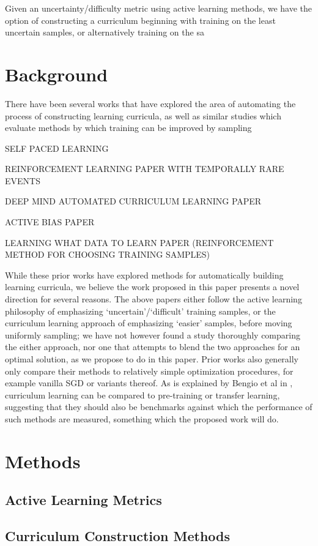 \documentclass[a4paper,11pt]{article}
\begin{document}
Given an uncertainty/difficulty metric using active learning methods, we have the option of constructing a curriculum beginning with training on the least uncertain samples, or alternatively training on the sa 

\section{Background}
There have been several works that have explored the area of automating the process of constructing learning curricula, as well as similar studies which evaluate methods by which training can be improved by sampling 

SELF PACED LEARNING

REINFORCEMENT LEARNING PAPER WITH TEMPORALLY RARE EVENTS

DEEP MIND AUTOMATED CURRICULUM LEARNING PAPER

ACTIVE BIAS PAPER

LEARNING WHAT DATA TO LEARN PAPER (REINFORCEMENT METHOD FOR CHOOSING TRAINING SAMPLES)

While these prior works have explored methods for automatically building learning curricula, we believe the work proposed in this paper presents a novel direction for several reasons. The above papers either follow the active learning philosophy of emphasizing `uncertain'/`difficult' training samples, or the curriculum learning approach of emphasizing `easier' samples, before moving uniformly sampling; we have not however found a study thoroughly comparing the either approach, nor one that attempts to blend the two approaches for an optimal solution, as we propose to do in this paper. Prior works also generally only compare their methods to relatively simple optimization procedures, for example vanilla SGD or variants thereof. As is explained by Bengio et al in \cite{Bengio 09}, curriculum learning can be compared to pre-training or transfer learning, suggesting that they should also be benchmarks against which the performance of such methods are measured, something which the proposed work will do. 

\section{Methods}
\subsection*{Active Learning Metrics}

\subsection*{Curriculum Construction Methods}
\end{document}
